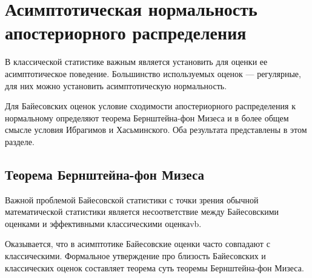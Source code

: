 \section{Асимптотическая нормальность апостериорного распределения}

В классической статистике важным является установить для оценки ее асимптотическое поведение.
Большинство используемых оценок --- регулярные, для них
можно установить асимптотическую нормальность.

Для Байесовских оценок условие сходимости апостериорного распределения к нормальному определяют теорема Бернштейна-фон Мизеса и в более общем смысле условия Ибрагимов и Хасьминского.
Оба результата представлены в этом разделе.


\subsection{Теорема Бернштейна-фон Мизеса}

Важной проблемой Байесовской статистики с точки зрения обычной математической статистики является несоответствие между Байесовскими оценками и эффективными классическими оценкаvb.

Оказывается, что в асимптотике Байесовские оценки часто совпадают с классическими.
Формальное утверждение про близость Байесовских и классических оценок 
составляет теорема суть теоремы Бернштейна-фон Мизеса.

